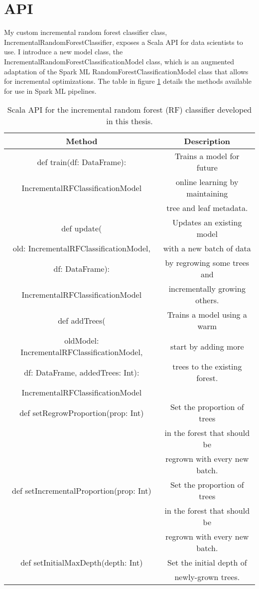 \section{API}

My custom incremental random forest classifier class,
IncrementalRandomForestClassifier, exposes a Scala API for data scientists to
use. I introduce a new model class, the
IncrementalRandomForestClassificationModel class, which is an augmented
adaptation of the Spark ML RandomForestClassificationModel class that allows
for incremental optimizations. The table in figure \ref{tab:api} details the
methods available for use in Spark ML pipelines.

\begin{table}
  \centering
  \begin{tabular}{ | c | c | }
  \hline
  \textbf{Method} & \textbf{Description} \\
  \hline
  def train(df: DataFrame): & Trains a model for future \\
  IncrementalRFClassificationModel &  online learning by maintaining \\
  & tree and leaf metadata. \\ 
  \hline
  def update( & Updates an existing model \\
  old: IncrementalRFClassificationModel, & with a new batch of data \\
  df: DataFrame): & by regrowing some trees and \\
  IncrementalRFClassificationModel & incrementally growing others. \\
  \hline
  def addTrees( & Trains a model using a warm \\
  oldModel: IncrementalRFClassificationModel, & start by adding more \\
  df: DataFrame, addedTrees: Int): & trees to the existing forest. \\
  IncrementalRFClassificationModel & \\ 
  \hline
  def setRegrowProportion(prop: Int) & Set the proportion of trees \\
  & in the forest that should be \\
  & regrown with every new batch. \\
  \hline
  def setIncrementalProportion(prop: Int) & Set the proportion of trees \\
  & in the forest that should be \\
  & regrown with every new batch. \\
  \hline
  def setInitialMaxDepth(depth: Int) & Set the initial depth of \\
  & newly-grown trees. \\
  \hline
  \end{tabular}
  \caption{Scala API for the incremental random forest (RF) classifier developed in this thesis.}
  \label{tab:api}
\end{table}
